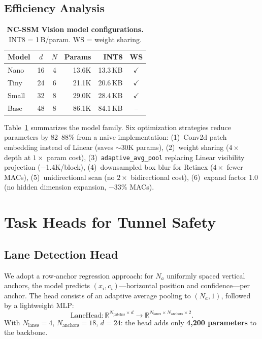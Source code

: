 \documentclass[10pt,twocolumn,letterpaper]{article}
\begin{document}
\subsection{Efficiency Analysis}

\begin{table}[t]
\centering
\caption{\textbf{NC-SSM Vision model configurations.} INT8 = 1\,B/param. WS = weight sharing.}
\label{tab:configs}
\setlength{\tabcolsep}{4pt}
\footnotesize
\begin{tabular}{@{}lccrrc@{}}
\toprule
\textbf{Model} & $d$ & $N$ & \textbf{Params} & \textbf{INT8} & \textbf{WS} \\
\midrule
Nano  & 16 & 4 & 13.6K & 13.3\,KB & $\checkmark$ \\
Tiny  & 24 & 6 & 21.1K & 20.6\,KB & $\checkmark$ \\
Small & 32 & 8 & 29.0K & 28.4\,KB & $\checkmark$ \\
Base  & 48 & 8 & 86.1K & 84.1\,KB & -- \\
\bottomrule
\end{tabular}
\end{table}

Table~\ref{tab:configs} summarizes the model family.
Six optimization strategies reduce parameters by 82--88\% from a naive implementation:
(1)~Conv2d patch embedding instead of Linear (saves $\sim$30K params),
(2)~weight sharing ($4\times$ depth at $1\times$ param cost),
(3)~\texttt{adaptive\_avg\_pool} replacing Linear visibility projection ($-$1.4K/block),
(4)~downsampled box blur for Retinex ($4\times$ fewer MACs),
(5)~unidirectional scan (no $2\times$ bidirectional cost),
(6)~expand factor 1.0 (no hidden dimension expansion, $-$33\% MACs).


\section{Task Heads for Tunnel Safety}
\label{sec:tasks}

\subsection{Lane Detection Head}

We adopt a row-anchor regression approach: for $N_a$ uniformly spaced vertical anchors, the model predicts $(x_i, c_i)$---horizontal position and confidence---per anchor.
The head consists of an adaptive average pooling to $(N_a, 1)$, followed by a lightweight MLP:
\begin{equation}
\text{LaneHead}: \mathbb{R}^{N_{\text{patches}} \times d} \to \mathbb{R}^{N_{\text{lanes}} \times N_{\text{anchors}} \times 2}.
\end{equation}
With $N_{\text{lanes}} = 4$, $N_{\text{anchors}} = 18$, $d = 24$: the head adds only \textbf{4,200 parameters} to the backbone.
\end{document}

